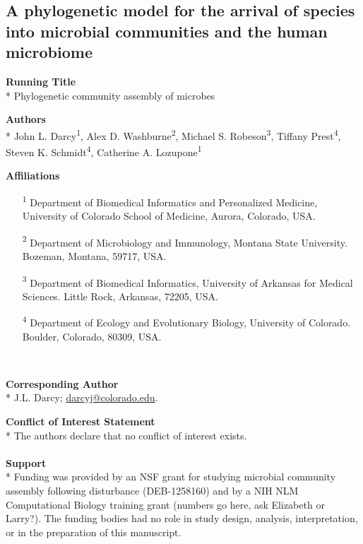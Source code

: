 \documentclass{article}
\begin{document}
{\parindent0pt %
\begin{adjustwidth}{1cm}{1cm} \begin{center}
\section{A phylogenetic model for the arrival of species into microbial communities and the human microbiome}
\end{center}  \end{adjustwidth}

\par
\textbf{Running Title}\\*
Phylogenetic community assembly of microbes
\\\par
\textbf{Authors}\\*
John L. Darcy\textsuperscript{1},
Alex D. Washburne\textsuperscript{2},
Michael S. Robeson\textsuperscript{3},
Tiffany Prest\textsuperscript{4},
Steven K. Schmidt\textsuperscript{4},
Catherine A. Lozupone\textsuperscript{1}
\\\par
\textbf{Affiliations}
\begin{enumerate}[topsep=0pt,itemsep=-1ex,partopsep=1ex,parsep=1ex, leftmargin=*,align=left]
	\item[\textsuperscript{1}] Department of Biomedical Informatics and Personalized Medicine, University of Colorado School of Medicine, Aurora, Colorado, USA.
	\item[\textsuperscript{2}] Department of Microbiology and Immunology, Montana State University. Bozeman, Montana, 59717, USA.
	\item[\textsuperscript{3}] Department of Biomedical Informatics, University of Arkansas for Medical Sciences. Little Rock, Arkansas, 72205, USA.
	\item[\textsuperscript{4}] Department of Ecology and Evolutionary Biology, University of Colorado. Boulder, Colorado, 80309, USA.
\end{enumerate}
\ \par
\textbf{Corresponding Author}\\*
J.L. Darcy; \href{mailto:darcyj@colorado.edu}{darcyj@colorado.edu}.
\\\par
\textbf{Conflict of Interest Statement}\\*
The authors declare that no conflict of interest exists.\\
\\
\textbf{Support}\\*
Funding was provided by an NSF grant for studying microbial community assembly following disturbance (DEB-1258160) and by a NIH NLM Computational Biology training grant (numbers go here, ask Elizabeth or Larry?). The funding bodies had no role in study design, analysis, interpretation, or in the preparation of this manuscript.\\

} %
\end{document}
